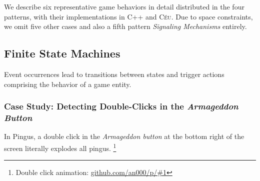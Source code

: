 \documentclass{vgtc}                          %
\newcommand{\CEU}{\textsc{C\'{e}u}\xspace}
\begin{document}
We describe six representative game behaviors in detail distributed in the four
patterns, with their implementations in C++ and \CEU.
%
Due to space constraints, we omit five other cases and also a fifth pattern
\emph{Signaling Mechanisms} entirely.

\subsection{Finite State Machines}
\label{sec.pats.fsms}

    Event occurrences lead to transitions between states and trigger actions
    comprising the behavior of a game entity.

\subsubsection{Case Study: Detecting Double-Clicks in the \emph{Armageddon Button}}


In Pingus, a double click in the \emph{Armageddon button} at the bottom right
of the screen literally explodes all pingus.%
\footnote{Double click animation: \url{github.com/an000/p/#1} }
\end{document}
